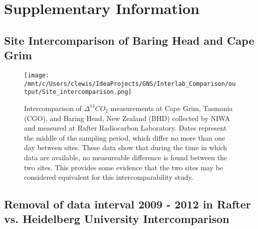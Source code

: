 \section{Supplementary Information}
\label{sec:conc}
\subsection{Site Intercomparison of Baring Head and Cape Grim}
\begin{figure}[h!]
  \caption{ Intercomparison of ${\Delta^{14}CO_{2}}$ measurements  at Cape Grim, Tasmania (CGO), and Baring Head, New Zealand (BHD) collected by NIWA and measured at Rafter Radiocarbon Laboratory. Dates represent the middle of the sampling period, which differ no more than one day between sites. These data show that during the time in which data are available, no measureable difference is found between the two sites. This provides some evidence that the two sites may be considered equivalent for this intercomparability study.}
  \texttt{[image: /mnt/c/Users/clewis/IdeaProjects/GNS/Interlab\_Comparison/output/Site\_intercomparison.png]}
\label{fig:bhdvcgo}
\end{figure}

\subsection{Removal of data interval 2009 - 2012 in Rafter vs. Heidelberg University Intercomparison}
